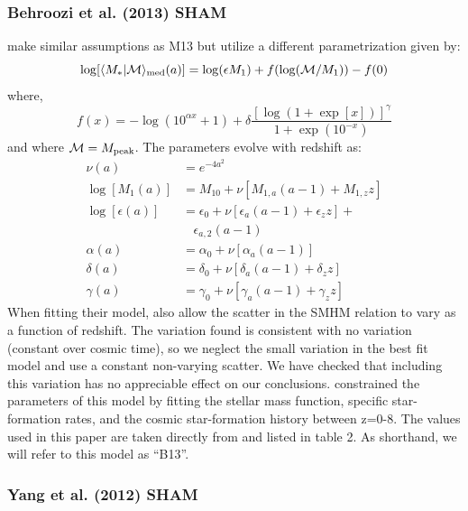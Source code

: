 \documentclass[useAMS,fleqn,usenatbib]{mnras}
\begin{document}
\subsubsection{Behroozi et al. (2013) SHAM}
\label{sec:b13}

\citet{Behroozi:2013fg} make similar assumptions as M13 but utilize a different parametrization given by:
%
\begin{equation}
\log[\langle M_*|\mathcal{M} \rangle_{\rm med}(a)] = \log(\epsilon M_1) + f(\log(\mathcal{M}/M_1)) - f(0)
\end{equation}
%
where,
% 
\begin{equation}
f(x) = -\log(10^{\alpha x}+1) + \delta\frac{\left[ \log(1+\exp[x])\right]^{\gamma}}{1+\exp(10^{-x})}
\end{equation}
%
and where $\mathcal{M} = M_{\rm peak}$.  The parameters evolve with redshift as:
%
\begin{align}
\nu(a) & = e^{-4a^2}  \\
\log[M_1(a)] & =  M_{10} + \nu\left[ M_{1,a}(a-1) + M_{1,z}z \right] \\
\log[\epsilon(a)] & = \epsilon_0 + \nu \left[\epsilon_a(a-1) +\epsilon_z z\right] + \\ \nonumber 
& ~~~~ \epsilon_{a,2}(a-1)  \\
\alpha(a) & =  \alpha_{0} + \nu\left[ \alpha_a(a-1)\right] \\
\delta(a) & =   \delta_{0} + \nu\left[ \delta_a(a-1) + \delta_z z\right] \\
\gamma(a) &= \gamma_{0} + \nu\left[ \gamma_a(a-1) + \gamma_z z\right]
\end{align}
% 
When fitting their model, \cite{Behroozi:2013fg} also allow the scatter in the SMHM relation to vary as a function of redshift.  The variation found is consistent with no variation (constant over cosmic time), so we neglect the small variation in the best fit model and use a constant non-varying scatter.  We have checked that including this variation has no appreciable effect on our conclusions. \cite{Behroozi:2013fg} constrained the parameters of this model by fitting the stellar mass function, specific star-formation rates, and the cosmic star-formation history between z=0-8.  The values used in this paper are taken directly from \cite{Behroozi:2013fg} and listed in table 2. As shorthand, we will refer to this model as ``B13''. 


\subsubsection{Yang et al. (2012) SHAM}
\label{sec:y12}
\end{document}
